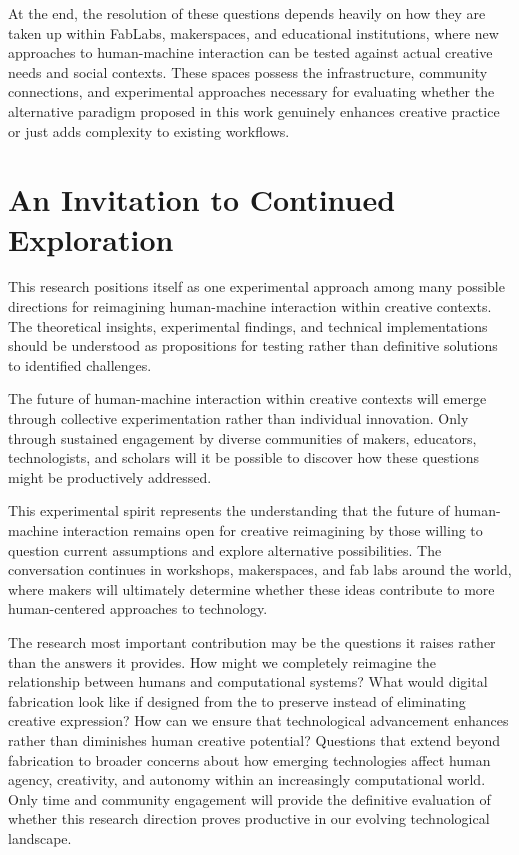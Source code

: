 \vspace{0.5cm}

At the end, the resolution of these questions depends heavily on how they are taken up within FabLabs, makerspaces, and educational institutions, where new approaches to human-machine interaction can be tested against actual creative needs and social contexts. These spaces possess the infrastructure, community connections, and experimental approaches necessary for evaluating whether the alternative paradigm proposed in this work genuinely enhances creative practice or just adds complexity to existing workflows.

\section{An Invitation to Continued Exploration}

This research positions itself as one experimental approach among many possible directions for reimagining human-machine interaction within creative contexts. The theoretical insights, experimental findings, and technical implementations should be understood as propositions for testing rather than definitive solutions to identified challenges.

\vspace{0.5cm}

The future of human-machine interaction within creative contexts will emerge through collective experimentation rather than individual innovation. Only through sustained engagement by diverse communities of makers, educators, technologists, and scholars will it be possible to discover how these questions might be productively addressed.

\vspace{0.5cm}

This experimental spirit represents the understanding that the future of human-machine interaction remains open for creative reimagining by those willing to question current assumptions and explore alternative possibilities. The conversation continues in workshops, makerspaces, and fab labs around the world, where makers will ultimately determine whether these ideas contribute to more human-centered approaches to technology.

\vspace{0.5cm}

The research most important contribution may be the questions it raises rather than the answers it provides. How might we completely reimagine the relationship between humans and computational systems? What would digital fabrication look like if designed from the to preserve instead of eliminating creative expression? How can we ensure that technological advancement enhances rather than diminishes human creative potential? Questions that extend beyond fabrication to broader concerns about how emerging technologies affect human agency, creativity, and autonomy within an increasingly computational world. Only time and community engagement will provide the definitive evaluation of whether this research direction proves productive in our evolving technological landscape.